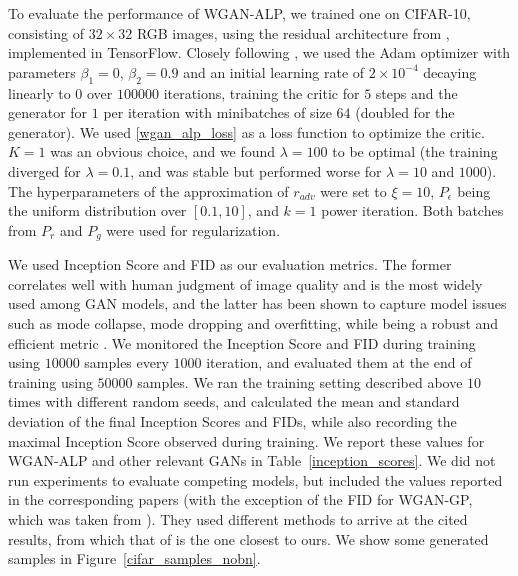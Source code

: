 \documentclass{article}
\begin{document}
To evaluate the performance of WGAN-ALP, we trained one on CIFAR-10, consisting of $32 \times 32$ RGB images, using the residual architecture from \citet{Gulrajanietal2017}, implemented in TensorFlow. Closely following \citet{Gulrajanietal2017}, we used the Adam optimizer \citep{Kingmaetal2014} with parameters $\beta_1=0$, $\beta_2=0.9$ and an initial learning rate of $2 \times 10^{-4}$ decaying linearly to 0 over $100000$ iterations, training the critic for $5$ steps and the generator for $1$ per iteration with minibatches of size $64$ (doubled for the generator). We used \eqref{wgan_alp_loss} as a loss function to optimize the critic. $K=1$ was an obvious choice, and we found $\lambda=100$ to be optimal (the training diverged for $\lambda=0.1$, and was stable but performed worse for $\lambda=10$ and $1000$). The hyperparameters of the approximation of $r_{adv}$ were set to $\xi=10$, $P_\epsilon$ being the uniform distribution over $[0.1, 10]$, and $k=1$ power iteration. Both batches from $P_r$ and $P_g$ were used for regularization.

We used Inception Score \citep{Salimansetal2016} and FID \citep{Heuseletal2017} as our evaluation metrics. The former correlates well with human judgment of image quality and is the most widely used among GAN models, and the latter has been shown to capture model issues such as mode collapse, mode dropping and overfitting, while being a robust and efficient metric \citep{Xuetal2018}. We monitored the Inception Score and FID during training using $10000$ samples every $1000$ iteration, and evaluated them at the end of training using $50000$ samples. We ran the training setting described above $10$ times with different random seeds, and calculated the mean and standard deviation of the final Inception Scores and FIDs, while also recording the maximal Inception Score observed during training. We report these values for WGAN-ALP and other relevant GANs \citep{Gulrajanietal2017, Petzkaetal2018, Zhouetal2019b, Weietal2018, Miyatoetal2018, Adleretal2018, Karrasetal2017} in Table~\ref{inception_scores}. We did not run experiments to evaluate competing models, but included the values reported in the corresponding papers (with the exception of the FID for WGAN-GP, which was taken from \citet{Zhouetal2019b}). They used different methods to arrive at the cited results, from which that of \citet{Adleretal2018} is the one closest to ours. We show some generated samples in Figure~\ref{cifar_samples_nobn}.
\end{document}
